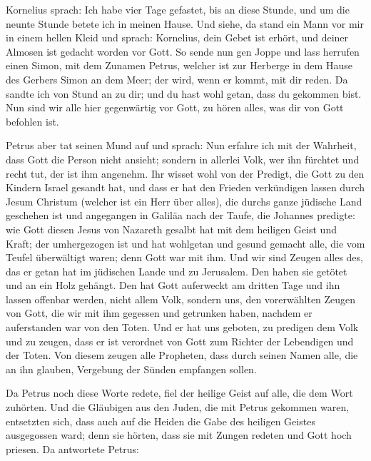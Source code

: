  Kornelius sprach: Ich habe vier Tage gefastet, bis an
diese Stunde, und um die neunte Stunde betete ich in meinen Hause. Und
siehe, da stand ein Mann vor mir in einem hellen Kleid 
und sprach: Kornelius, dein Gebet ist erhört, und deiner Almosen ist
gedacht worden vor Gott.  So sende nun gen Joppe und lass
herrufen einen Simon, mit dem Zunamen Petrus, welcher ist zur Herberge
in dem Hause des Gerbers Simon an dem Meer; der wird, wenn er kommt, mit
dir reden.  Da sandte ich von Stund an zu dir; und du
hast wohl getan, dass du gekommen bist. Nun sind wir alle hier
gegenwärtig vor Gott, zu hören alles, was dir von Gott befohlen ist.

 Petrus aber tat seinen Mund auf und sprach: Nun erfahre
ich mit der Wahrheit, dass Gott die Person nicht ansieht;
 sondern in allerlei Volk, wer ihn fürchtet und recht
tut, der ist ihm angenehm.  Ihr wisset wohl von der
Predigt, die Gott zu den Kindern Israel gesandt hat, und dass er hat den
Frieden verkündigen lassen durch Jesum Christum (welcher ist ein Herr
über alles),  die durchs ganze jüdische Land geschehen
ist und angegangen in Galiläa nach der Taufe, die Johannes predigte:
 wie Gott diesen Jesus von Nazareth gesalbt hat mit dem
heiligen Geist und Kraft; der umhergezogen ist und hat wohlgetan und
gesund gemacht alle, die vom Teufel überwältigt waren; denn Gott war mit
ihm.  Und wir sind Zeugen alles des, das er getan hat im
jüdischen Lande und zu Jerusalem. Den haben sie getötet und an ein Holz
gehängt.  Den hat Gott auferweckt am dritten Tage und ihn
lassen offenbar werden,  nicht allem Volk, sondern uns,
den vorerwählten Zeugen von Gott, die wir mit ihm gegessen und getrunken
haben, nachdem er auferstanden war von den Toten.  Und er
hat uns geboten, zu predigen dem Volk und zu zeugen, dass er ist
verordnet von Gott zum Richter der Lebendigen und der Toten.
 Von diesem zeugen alle Propheten, dass durch seinen
Namen alle, die an ihn glauben, Vergebung der Sünden empfangen sollen.

 Da Petrus noch diese Worte redete, fiel der heilige
Geist auf alle, die dem Wort zuhörten.  Und die Gläubigen
aus den Juden, die mit Petrus gekommen waren, entsetzten sich, dass auch
auf die Heiden die Gabe des heiligen Geistes ausgegossen ward;
 denn sie hörten, dass sie mit Zungen redeten und Gott
hoch priesen. Da antwortete Petrus:

